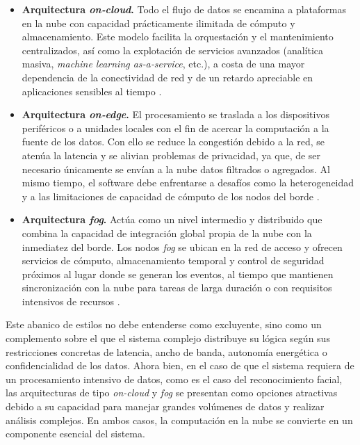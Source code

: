 \begin{itemize}
    \item \textbf{Arquitectura \textit{on‑cloud}.} Todo el flujo de datos se encamina a plataformas en la nube con capacidad prácticamente ilimitada de cómputo y almacenamiento. Este modelo facilita la orquestación y el mantenimiento centralizados, así como la explotación de servicios avanzados (analítica masiva, \textit{machine learning as‑a‑service}, etc.), a costa de una mayor dependencia de la conectividad de red y de un retardo apreciable en aplicaciones sensibles al tiempo \cite{dauda_survey_2024}.
    
    \item \textbf{Arquitectura \textit{on‑edge}.}  El procesamiento se traslada a los dispositivos periféricos o a unidades locales con el fin de acercar la computación a la fuente de los datos.  Con ello se reduce la congestión debido a la red, se atenúa la latencia y se alivian problemas de privacidad, ya que, de ser necesario únicamente se envían a la nube datos filtrados o agregados.  Al mismo tiempo, el software debe enfrentarse a desafíos como la heterogeneidad y a las limitaciones de capacidad de cómputo de los nodos del borde \cite{dauda_survey_2024}.  
    
    \item \textbf{Arquitectura \textit{fog}.}  Actúa como un nivel intermedio y distribuido que combina la capacidad de integración global propia de la nube con la inmediatez del borde.  Los nodos \textit{fog} se ubican en la red de acceso y ofrecen servicios de cómputo, almacenamiento temporal y control de seguridad próximos al lugar donde se generan los eventos, al tiempo que mantienen sincronización con la nube para tareas de larga duración o con requisitos intensivos de recursos \cite{sethi_iot_2017}.  

\end{itemize}

Este abanico de estilos no debe entenderse como excluyente, sino como un complemento sobre el que el sistema complejo distribuye su lógica según sus restricciones concretas de latencia, ancho de banda, autonomía energética o confidencialidad de los datos. Ahora bien, en el caso de que el sistema requiera de un procesamiento intensivo de datos, como es el caso del reconocimiento facial, las arquitecturas de tipo \textit{on-cloud} y \textit{fog} se presentan como opciones atractivas debido a su capacidad para manejar grandes volúmenes de datos y realizar análisis complejos. En ambos casos, la computación en la nube se convierte en un componente esencial del sistema.

